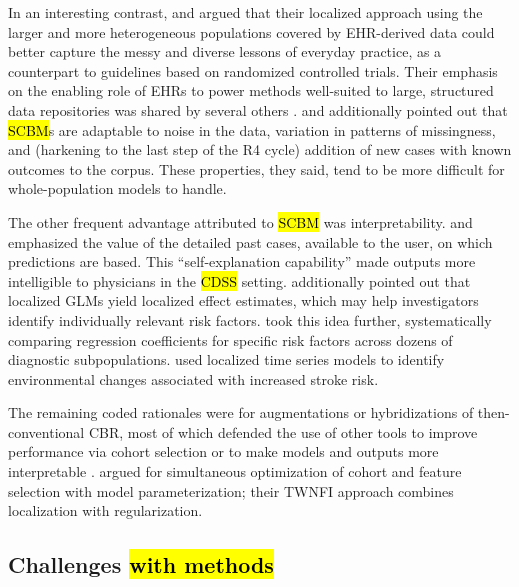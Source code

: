 \documentclass[sn-mathphys,Numbered,pdflatex]{sn-jnl}
\theoremstyle{remark}
\theoremstyle{definition}
\begin{document}
In an interesting contrast, \citet{Tang2021} and \citet{Ng2021} argued
that their localized approach using the larger and more heterogeneous
populations covered by EHR-derived data could better capture the messy
and diverse lessons of everyday practice, as a counterpart to guidelines
based on randomized controlled trials. Their emphasis on the enabling
role of EHRs to power methods well-suited to large, structured data
repositories was shared by several others
\citep{CampilloGimenez2013, Nicolas2014, Verma2015, Lee2017}.
\citet{Verma2015} and \citet{Zhang2018} additionally pointed out that
\hl{SCBM}s are adaptable to noise in the data, variation in patterns of
missingness, and (harkening to the last step of the R4 cycle) addition
of new cases with known outcomes to the corpus. These properties, they
said, tend to be more difficult for whole-population models to handle.

The other frequent advantage attributed to \hl{SCBM} was
interpretability. \citet{Elter2007} and \citet{Nicolas2014} emphasized
the value of the detailed past cases, available to the user, on which
predictions are based. This ``self-explanation capability'' made outputs
more intelligible to physicians in the \hl{CDSS} setting. \citet{Ng2015}
additionally pointed out that localized GLMs yield localized effect
estimates, which may help investigators identify individually relevant
risk factors. \citet{Liu2022} took this idea further, systematically
comparing regression coefficients for specific risk factors across
dozens of diagnostic subpopulations. \citet{Doborjeh2022} used localized
time series models to identify environmental changes associated with
increased stroke risk.

The remaining coded rationales were for augmentations or hybridizations
of then-conventional CBR, most of which defended the use of other tools
to improve performance via cohort selection
\citep{CampilloGimenez2013, Nicolas2014, Vilhena2016} or to make models
and outputs more interpretable \citep{Lopez2011, Wang2019}.
\citet{Liang2015} argued for simultaneous optimization of cohort and
feature selection with model parameterization; their TWNFI approach
combines localization with regularization.

\subsection{\texorpdfstring{Challenges\hl{ with methods}}{Challenges}}\label{challenges}
\end{document}
